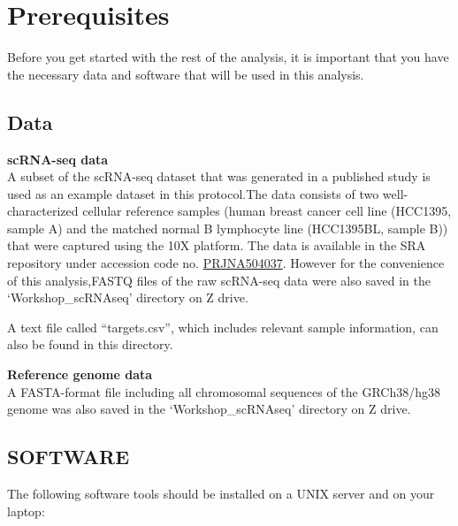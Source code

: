 \documentclass[
]{book}
\begin{document}
\hypertarget{prerequisites}{%
\chapter{Prerequisites}\label{prerequisites}}

Before you get started with the rest of the analysis, it is important that you have the necessary data and software that will be used in this analysis.

\hypertarget{prereq}{%
\section{Data}\label{prereq}}

\textbf{scRNA-seq data}\\

A subset of the scRNA-seq dataset that was generated in a published study \citep{chen2020multicenter} is used as an example dataset in this protocol.The data consists of two well-characterized cellular reference samples (human breast cancer cell line (HCC1395, sample A) and the matched normal B lymphocyte line (HCC1395BL, sample B)) that were captured using the 10X platform. The data is available in the SRA repository under accession code no. \href{https://www.ncbi.nlm.nih.gov/bioproject/?term=PRJNA504037}{PRJNA504037}. However for the convenience of this analysis,FASTQ files of the raw scRNA-seq data were also saved in the `Workshop\_scRNAseq' directory on Z drive.

A text file called ``targets.csv'', which includes relevant sample information, can also be found in this directory.

\textbf{Reference genome data}\\

A FASTA-format file including all chromosomal sequences of the GRCh38/hg38 genome was also saved in the `Workshop\_scRNAseq' directory on Z drive.

\hypertarget{software}{%
\section{SOFTWARE}\label{software}}

The following software tools should be installed on a UNIX server and on your laptop:
\end{document}
